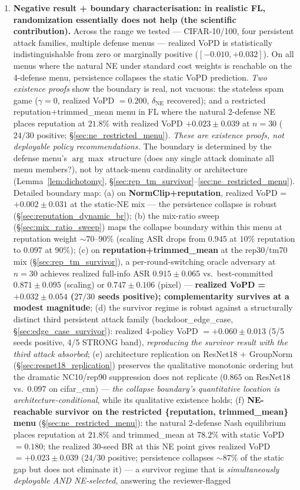\documentclass{article}
\begin{document}
\begin{enumerate}
    \item \textbf{Negative result + boundary characterisation: in realistic FL, randomization essentially does not help (the scientific contribution).} Across the range we tested --- CIFAR-10/100, four persistent attack families, multiple defense menus --- realized VoPD is statistically indistinguishable from zero or marginally positive ($[-0.010, +0.032]$). On all menus where the natural NE under standard cost weights is reachable on the 4-defense menu, persistence collapses the static VoPD prediction. \emph{Two existence proofs} show the boundary is real, not vacuous: the stateless spam game ($\gamma = 0$, realized VoPD $= 0.200$, $\delta_{\text{NE}}$ recovered); and a restricted reputation+trimmed\_mean menu in FL where the natural 2-defense NE places reputation at $21.8\%$ with realized VoPD $\mathbf{+0.023 \pm 0.039}$ at $n=30$ ($24/30$ positive; §\ref{sec:ne_restricted_menu}). \emph{These are existence proofs, not deployable policy recommendations.} The boundary is determined by the defense menu's $\arg\max$ structure (does any single attack dominate all menu members?), not by attack-menu cardinality or architecture (Lemma~\ref{lem:dichotomy}, §\ref{sec:rep_tm_survivor}--\ref{sec:ne_restricted_menu}). Detailed boundary map: (a) on \textbf{NormClip+reputation}, realized VoPD = $+0.002 \pm 0.031$ at the static-NE mix --- the persistence collapse is robust (§\ref{sec:reputation_dynamic_br}); (b) the mix-ratio sweep (§\ref{sec:mix_ratio_sweep}) maps the collapse boundary within this menu at reputation weight $\sim 70$--$90\%$ (scaling ASR drops from $0.945$ at $10\%$ reputation to $0.097$ at $90\%$); (c) on \textbf{reputation+trimmed\_mean} at the rep30/tm70 mix (§\ref{sec:rep_tm_survivor}), a per-round-switching oracle adversary at $n=30$ achieves realized full-info ASR $0.915 \pm 0.065$ vs.\ best-committed $0.871 \pm 0.095$ (scaling) or $0.747 \pm 0.106$ (pixel) --- \textbf{realized VoPD = $+0.032 \pm 0.054$ ($27/30$ seeds positive); complementarity survives at a modest magnitude}; (d) the survivor regime is robust against a structurally distinct third persistent attack family (backdoor\_edge\_case, §\ref{sec:edge_case_survivor}): realized 4-policy VoPD $= +0.060 \pm 0.013$ (5/5 seeds positive, 4/5 STRONG band), \emph{reproducing the survivor result with the third attack absorbed}; (e) architecture replication on ResNet18 + GroupNorm (§\ref{sec:resnet18_replication}) preserves the qualitative monotonic ordering but the dramatic NC10/rep90 suppression does not replicate ($0.865$ on ResNet18 vs.\ $0.097$ on cifar\_cnn) --- \emph{the collapse boundary's quantitative location is architecture-conditional}, while its qualitative existence holds; (f) \textbf{NE-reachable survivor on the restricted \{reputation, trimmed\_mean\} menu} (§\ref{sec:ne_restricted_menu}): the natural 2-defense Nash equilibrium places reputation at $21.8\%$ and trimmed\_mean at $78.2\%$ with static VoPD $= \mathbf{0.180}$; the realized 30-seed BR at this NE point gives realized VoPD $= \mathbf{+0.023 \pm 0.039}$ ($24/30$ positive; persistence collapses $\sim 87\%$ of the static gap but does not eliminate it) --- a survivor regime that is \emph{simultaneously deployable AND NE-selected}, answering the reviewer-flagged 
\end{enumerate}
\end{document}

